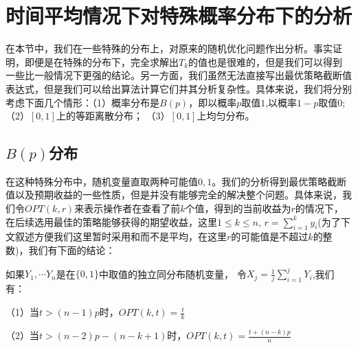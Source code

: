 \documentclass[bachelor]{thuthesis}
\begin{document}

\chapter{时间平均情况下对特殊概率分布下的分析}
\label{cha:china}

在本节中，我们在一些特殊的分布上，对原来的随机优化问题作出分析。事实证明，即便是在特殊的分布下，完全求解出$T_k$的值也是很难的，但是我们可以得到一些比一般情况下更强的结论。另一方面，我们虽然无法直接写出最优策略截断值表达式，但是我们可以给出算法计算它们并其分析复杂性。具体来说，我们将分别考虑下面几个情形：（1）概率分布是$B(p)$，即以概率$p$取值$1$,以概率$1-p$取值$0$; （2）$[0,1]$上的等距离散分布； （3）$[0,1]$上均匀分布。

\section{$B(p)$分布}

在这种特殊分布中，随机变量直取两种可能值$0,1$。我们的分析得到最优策略截断值以及预期收益的一些性质，但是并没有能够完全的解决整个问题。具体来说，我们令$OPT(k,r)$来表示操作者在查看了前$k$个值，得到的当前收益为$r$的情况下，在后续选用最佳的策略能够获得的期望收益，这里$1\le k\le n$, $r=\sum_{i=1}^{k}y_i$(为了下文叙述方便我们这里暂时采用和而不是平均，在这里$r$的可能值是不超过$k$的整数)，我们有下面的结论：

\begin{theorem}

如果$Y_1,\cdots Y_n$是在$\{0,1\}$中取值的独立同分布随机变量， 令$X_j=\frac{1}{j}\sum_{i=1}^{j}Y_i$,我们有：

（1）当$t>(n-1)p$时，$OPT(k,t)=\frac{t}{k}$

（2）当$t>(n-2)p-(n-k+1)$时，$OPT(k,t)=\frac{t+(n-k)p}{n}$

\end{theorem}
\end{document}
